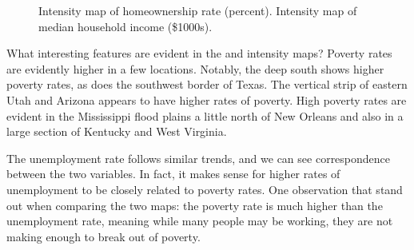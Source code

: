 \begin{figure}
\centering
{}
\caption{ Intensity map of homeownership rate (percent).  Intensity map of median household income (\$1000s).}
\label{countyIntensityMaps2}
\end{figure}

\begin{example}{What interesting features are evident in the
     and 
    intensity maps?}
  Poverty rates are evidently higher in a few locations.
  Notably, the deep south shows higher poverty rates,
  as does the southwest border of Texas.
  The vertical strip of eastern Utah and Arizona
  appears to have higher rates of poverty.
  High poverty rates are evident in the Mississippi
  flood plains a little north of New Orleans and
  also in a large section of Kentucky and West Virginia.

  The unemployment rate follows similar trends,
  and we can see correspondence between the two
  variables. In fact, it makes sense for higher rates
  of unemployment to be closely related to poverty rates.
  One observation that stand out when comparing the two maps:
  the poverty rate is much higher than the unemployment
  rate, meaning while many people may be working,
  they are not making enough to break out of poverty.
\end{example}

